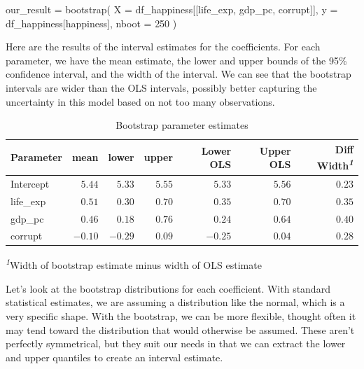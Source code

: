 \documentclass[
  letterpaper,
]{krantz}
\newenvironment{Shaded}{}{}
\newcommand{\DecValTok}[1]{\textcolor[rgb]{0.25,0.63,0.44}{#1}}
\newcommand{\NormalTok}[1]{#1}
\newcommand{\OperatorTok}[1]{\textcolor[rgb]{0.40,0.40,0.40}{#1}}
\newcommand{\StringTok}[1]{\textcolor[rgb]{0.25,0.44,0.63}{#1}}
\begin{document}
\begin{Shaded}
\begin{Highlighting}[]
\NormalTok{our\_result }\OperatorTok{=}\NormalTok{ bootstrap(}
\NormalTok{    X }\OperatorTok{=}\NormalTok{ df\_happiness[[}\StringTok{\textquotesingle{}life\_exp\textquotesingle{}}\NormalTok{, }\StringTok{\textquotesingle{}gdp\_pc\textquotesingle{}}\NormalTok{, }\StringTok{\textquotesingle{}corrupt\textquotesingle{}}\NormalTok{]],}
\NormalTok{    y }\OperatorTok{=}\NormalTok{ df\_happiness[}\StringTok{\textquotesingle{}happiness\textquotesingle{}}\NormalTok{],}
\NormalTok{    nboot }\OperatorTok{=} \DecValTok{250}
\NormalTok{)}
\end{Highlighting}
\end{Shaded}

Here are the results of the interval estimates for the coefficients. For
each parameter, we have the mean estimate, the lower and upper bounds of
the 95\% confidence interval, and the width of the interval. We can see
that the bootstrap intervals are wider than the OLS intervals, possibly
better capturing the uncertainty in this model based on not too many
observations.

\hypertarget{tbl-bootstrap}{}
\setlength{\LTpost}{0mm}
\begin{longtable}{lrrrrrr}
\caption{\label{tbl-bootstrap}Bootstrap parameter estimates }\tabularnewline

\toprule
Parameter & mean & lower & upper & Lower OLS & Upper OLS & Diff Width\textsuperscript{\textit{1}} \\ 
\midrule
Intercept & $5.44$ & $5.33$ & $5.55$ & $5.33$ & $5.56$ & $0.23$ \\ 
life\_exp & $0.51$ & $0.30$ & $0.70$ & $0.35$ & $0.70$ & $0.35$ \\ 
gdp\_pc & $0.46$ & $0.18$ & $0.76$ & $0.24$ & $0.64$ & $0.40$ \\ 
corrupt & $-0.10$ & $-0.29$ & $0.09$ & $-0.25$ & $0.04$ & $0.28$ \\ 
\bottomrule
\end{longtable}
\begin{minipage}{\linewidth}
\textsuperscript{\textit{1}}Width of bootstrap estimate minus width of OLS estimate\\
\end{minipage}

Let's look at the bootstrap distributions for each coefficient. With
standard statistical estimates, we are assuming a distribution like the
normal, which is a very specific shape. With the bootstrap, we can be
more flexible, thought often it may tend toward the distribution that
would otherwise be assumed. These aren't perfectly symmetrical, but they
suit our needs in that we can extract the lower and upper quantiles to
create an interval estimate.
\end{document}
